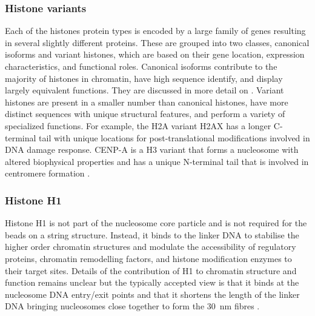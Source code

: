     \subsubsection{Histone variants}

      Each of the histones protein types is encoded by a large family
      of genes resulting in several slightly different proteins.
      These are grouped into two classes, canonical isoforms
      and variant histones, which are based on their gene location,
      expression characteristics, and functional roles.
      Canonical isoforms contribute to the majority
      of histones in chromatin, have high sequence identify, and display
      largely equivalent functions.  They are discussed in more detail on
      .
      Variant histones are present in a smaller number than canonical
      histones, have more distinct sequences with unique structural features,
      and perform a variety of specialized functions.  For example, the
      H2A variant H2AX has a longer C-terminal tail with unique locations
      for post-translational modifications involved in DNA damage
      response.  CENP-A is a H3 variant that
      forms a nucleosome with altered biophysical properties
      and has a unique N-terminal
      tail that is involved in centromere formation \citep{black2011-cenpa}.

    \subsubsection{Histone H1}

      Histone H1 is not part of the nucleosome core particle and is not
      required for the beads on a string structure.
      Instead, it binds to the linker DNA
      to stabilise the higher order
      chromatin structures and modulate the accessibility of
      regulatory proteins,
      chromatin remodelling factors, and histone modification enzymes
      to their target sites.
      Details
      of the contribution of H1 to chromatin structure and function remains
      unclear but the typically accepted view is that it binds at
      the nucleosome DNA entry/exit points and that it shortens the
      length of the linker DNA bringing nucleosomes close together
      to form the \SI{30}{\nm} fibres \citep{harshman2013h1-review}.

